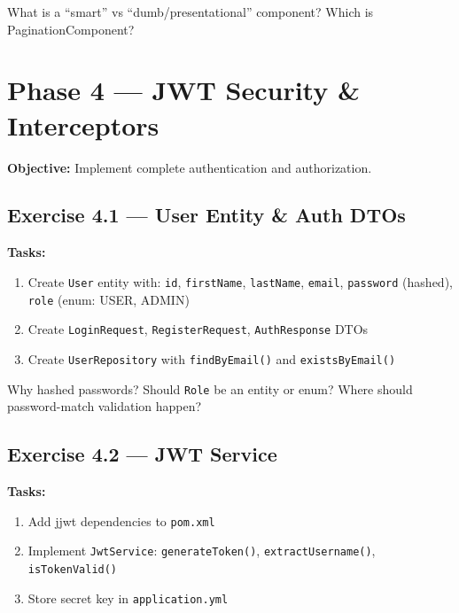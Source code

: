 \documentclass[12pt,a4paper]{report}
\begin{document}
\begin{thinkbox}
What is a ``smart'' vs ``dumb/presentational'' component? Which is PaginationComponent?
\end{thinkbox}

\chapter{Phase 4 --- JWT Security \& Interceptors}

\textbf{Objective:} Implement complete authentication and authorization.

\section{Exercise 4.1 --- User Entity \& Auth DTOs}

\textbf{Tasks:}
\begin{enumerate}
    \item Create \texttt{User} entity with: \texttt{id}, \texttt{firstName}, \texttt{lastName}, \texttt{email}, \texttt{password} (hashed), \texttt{role} (enum: USER, ADMIN)
    \item Create \texttt{LoginRequest}, \texttt{RegisterRequest}, \texttt{AuthResponse} DTOs
    \item Create \texttt{UserRepository} with \texttt{findByEmail()} and \texttt{existsByEmail()}
\end{enumerate}

\begin{thinkbox}
Why hashed passwords? Should \texttt{Role} be an entity or enum? Where should password-match validation happen?
\end{thinkbox}

\section{Exercise 4.2 --- JWT Service}

\textbf{Tasks:}
\begin{enumerate}
    \item Add jjwt dependencies to \texttt{pom.xml}
    \item Implement \texttt{JwtService}: \texttt{generateToken()}, \texttt{extractUsername()}, \texttt{isTokenValid()}
    \item Store secret key in \texttt{application.yml}
\end{enumerate}
\end{document}
